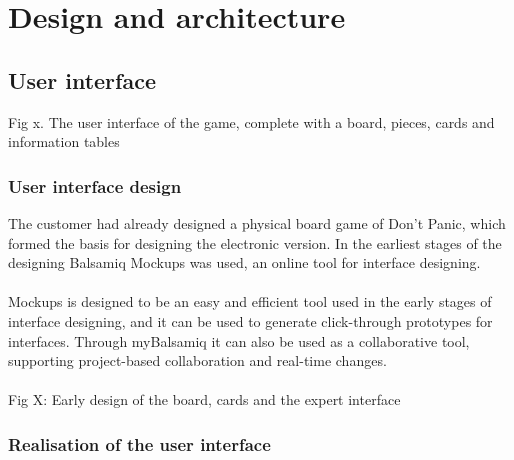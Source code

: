 \chapter{Design and architecture}

\section{User interface}
Fig x. The user interface of the game, complete with a board, pieces, cards and information tables







\subsection{User interface design}

The customer had already designed a physical board game of Don’t Panic, which formed the basis for designing the electronic version. In the earliest stages of the designing Balsamiq Mockups was used, an online tool for interface designing.\\
\\
Mockups is designed to be an easy and efficient tool used in the early stages of interface designing, and it can be used to generate click-through prototypes for interfaces. Through myBalsamiq it can also be used as a collaborative tool, supporting project-based collaboration and real-time changes.\\
\\ %
Fig X: Early design of the board, cards and the expert interface  

\subsection{Realisation of the user interface}

